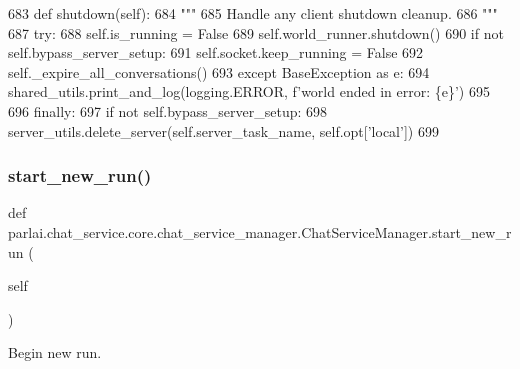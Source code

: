 \begin{DoxyCode}
683     \textcolor{keyword}{def }shutdown(self):
684         \textcolor{stringliteral}{"""}
685 \textcolor{stringliteral}{        Handle any client shutdown cleanup.}
686 \textcolor{stringliteral}{        """}
687         \textcolor{keywordflow}{try}:
688             self.is\_running = \textcolor{keyword}{False}
689             self.world\_runner.shutdown()
690             \textcolor{keywordflow}{if} \textcolor{keywordflow}{not} self.bypass\_server\_setup:
691                 self.socket.keep\_running = \textcolor{keyword}{False}
692             self.\_expire\_all\_conversations()
693         \textcolor{keywordflow}{except} BaseException \textcolor{keyword}{as} e:
694             shared\_utils.print\_and\_log(logging.ERROR, f\textcolor{stringliteral}{'world ended in error: \{e\}'})
695 
696         \textcolor{keywordflow}{finally}:
697             \textcolor{keywordflow}{if} \textcolor{keywordflow}{not} self.bypass\_server\_setup:
698                 server\_utils.delete\_server(self.server\_task\_name, self.opt[\textcolor{stringliteral}{'local'}])
699 
\end{DoxyCode}
\mbox{\label{classparlai_1_1chat__service_1_1core_1_1chat__service__manager_1_1ChatServiceManager_a1a41f5cd5f08e44605cb73fbb6b7e310}} 
\subsubsection{\texorpdfstring{start\+\_\+new\+\_\+run()}{start\_new\_run()}}
{\footnotesize\ttfamily def parlai.\+chat\+\_\+service.\+core.\+chat\+\_\+service\+\_\+manager.\+Chat\+Service\+Manager.\+start\+\_\+new\+\_\+run (\begin{DoxyParamCaption}\item[{}]{self }\end{DoxyParamCaption})}

\begin{DoxyVerb}Begin new run.
\end{DoxyVerb}
 

